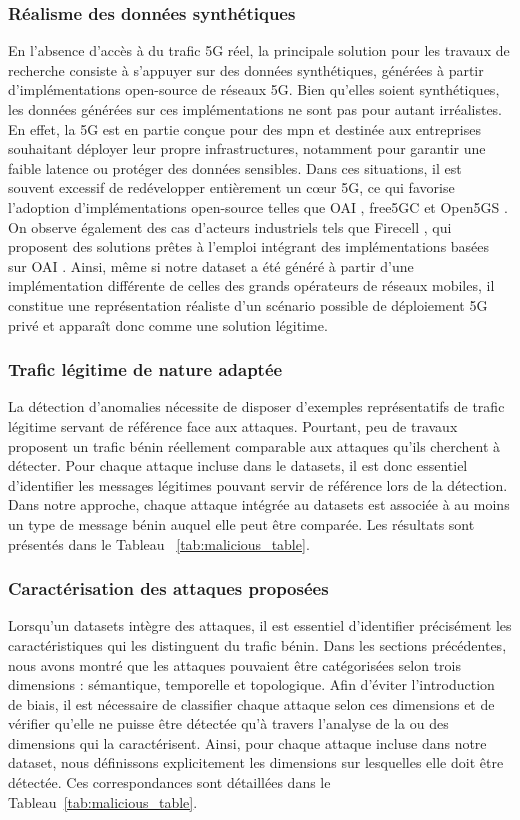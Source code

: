 \documentclass[a4paper,11pt,twoside]{StyleThese}
\begin{document}
\subsubsection{Réalisme des données synthétiques}
En l’absence d’accès à du trafic 5G réel, la principale solution pour les travaux de recherche consiste à s’appuyer sur des données synthétiques, générées à partir d’implémentations open-source de réseaux 5G. Bien qu'elles soient synthétiques, les données générées sur ces implémentations ne sont pas pour autant irréalistes. En effet, la 5G est en partie conçue pour des \gls{mpn} et destinée aux entreprises souhaitant déployer leur propre infrastructures, notamment pour garantir une faible latence ou protéger des données sensibles. Dans ces situations, il est souvent excessif de redévelopper entièrement un cœur 5G, ce qui favorise l’adoption d’implémentations open-source telles que OAI \cite{oai}, free5GC \cite{free5GC} et Open5GS \cite{open5gs}. On observe également des cas d’acteurs industriels tels que Firecell \cite{firecell}, qui proposent des solutions prêtes à l’emploi intégrant des implémentations basées sur OAI \cite{oai}. Ainsi, même si notre dataset a été généré à partir d’une implémentation différente de celles des grands opérateurs de réseaux mobiles, il constitue une représentation réaliste d’un scénario possible de déploiement 5G privé et apparaît donc comme une solution légitime.

\subsubsection{Trafic légitime de nature adaptée}
La détection d’anomalies nécessite de disposer d’exemples représentatifs de trafic légitime servant de référence face aux attaques. Pourtant, peu de travaux proposent un trafic bénin réellement comparable aux attaques qu’ils cherchent à détecter. Pour chaque attaque incluse dans le datasets, il est donc essentiel d’identifier les messages légitimes pouvant servir de référence lors de la détection. Dans notre approche, chaque attaque intégrée au datasets est associée à au moins un type de message bénin auquel elle peut être comparée. Les résultats sont présentés dans le Tableau ~\ref{tab:malicious_table}.

\subsubsection{Caractérisation des attaques proposées}
Lorsqu’un datasets intègre des attaques, il est essentiel d’identifier précisément les caractéristiques qui les distinguent du trafic bénin. Dans les sections précédentes, nous avons montré que les attaques pouvaient être catégorisées selon trois dimensions : sémantique, temporelle et topologique. Afin d’éviter l’introduction de biais, il est nécessaire de classifier chaque attaque selon ces dimensions et de vérifier qu’elle ne puisse être détectée qu’à travers l’analyse de la ou des dimensions qui la caractérisent.
%
Ainsi, pour chaque attaque incluse dans notre dataset, nous définissons explicitement les dimensions sur lesquelles elle doit être détectée. Ces correspondances sont détaillées dans le Tableau~\ref{tab:malicious_table}.
\end{document}
